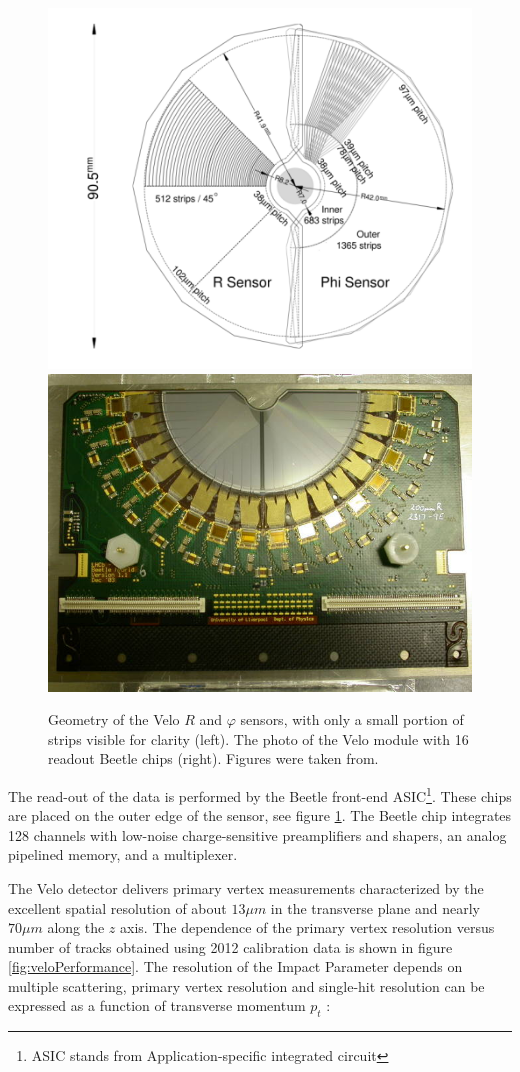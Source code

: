 \begin{figure}[h]
 \begin{center}
  \includegraphics[width=0.49\linewidth]{figures/VeloGeometry.PNG}
   \includegraphics[width=0.49\linewidth]{figures/Velo_photo.jpg}
   \caption{Geometry of the Velo $R$ and  $\varphi$ sensors, with only a small portion of strips visible for clarity (left). The photo of the Velo module with 16 readout Beetle chips (right). Figures were taken from\cite{lhcb}.  
     \label{fig:velo}}
 \end{center}
\end{figure}

The read-out of the data is performed by the Beetle front-end ASIC\footnote{ASIC stands from Application-specific integrated circuit}\cite{beetle}. These chips are placed on the outer edge of the sensor, see figure \ref{fig:velo}. The Beetle chip integrates 128 channels with low-noise charge-sensitive preamplifiers and shapers, an analog pipelined memory, and a multiplexer.


The Velo detector delivers primary vertex measurements characterized by the excellent spatial resolution of about $13 \mu m $ in the transverse plane and nearly $70 \mu m $ along the $z$ axis. The dependence of the primary vertex resolution versus number of tracks obtained using 2012 calibration data is shown in figure \ref{fig:veloPerformance}. The resolution of the Impact Parameter depends on  multiple scattering, primary vertex resolution and single-hit resolution can be expressed as a function of transverse momentum $p_t$ \cite{veloPerformance}: 

